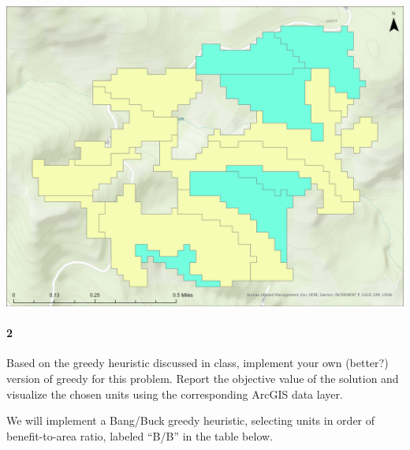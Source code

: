 \documentclass[12pt]{article}
\newenvironment{fullbox}{\begin{lrbox}{\savefullbox}\begin{minipage}{\dimexpr\textwidth-2\fboxsep\relax}}{\end{minipage}\end{lrbox}\begin{center}\framebox[\textwidth]{\usebox{\savefullbox}}\end{center}}
\newenvironment{pbox}[1][]{\begin{fullbox}\ifx#1\empty\else\paragraph{#1}\fi}{\end{fullbox}}
\theoremstyle{definition}
\begin{document}
\begin{center}
    \includegraphics[width=\textwidth]{map1.png}
\end{center}



\newpage
\begin{pbox}[2]
     Based on the greedy heuristic discussed in class, implement your own (better?) version of greedy for this problem. Report the objective value of the solution and visualize the chosen units using the corresponding ArcGIS data layer.
\end{pbox}

We will implement a Bang/Buck greedy heuristic, selecting units in order of benefit-to-area ratio, labeled ``B/B'' in the table below.
\end{document}
